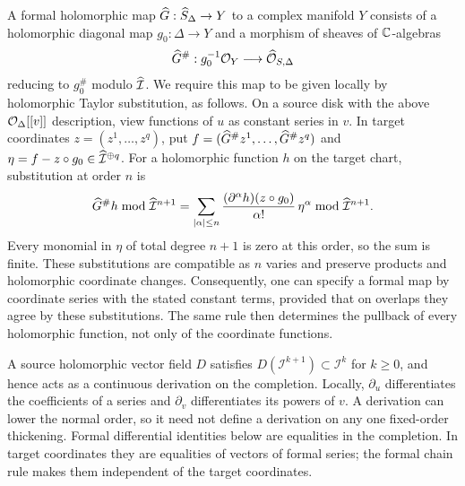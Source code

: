 A formal holomorphic map \(\widehat G:\widehat S_\Delta\to Y\) to a complex
manifold \(Y\) consists of a holomorphic diagonal map
\(g_0:\Delta\to Y\) and a morphism of sheaves of \(\mathbb C\)-algebras
\[
\widehat G^\#:g_0^{-1}\mathcal O_Y\longrightarrow\widehat{\mathcal O}_{S,\Delta}
\]
reducing to \(g_0^\#\) modulo \(\widehat{\mathcal I}\). We require this
map to be given locally by holomorphic Taylor substitution, as follows.
On a source disk with the above \(\mathcal O_\Delta[[v]]\) description,
view functions of \(u\) as constant series in \(v\).
In target coordinates \(z=(z^1,\ldots,z^q)\), put
\(f=(\widehat G^\#z^1,\ldots,\widehat G^\#z^q)\) and
\(\eta=f-z\circ g_0\in\widehat{\mathcal I}^{\oplus q}\). For a
holomorphic function \(h\) on the target chart, substitution at order
\(n\) is
\[
\widehat G^\#h\bmod\widehat{\mathcal I}^{n+1}
 =\sum_{|\alpha|\le n}
   \frac{(\partial^\alpha h)(z\circ g_0)}{\alpha!}\,
   \eta^\alpha\bmod\widehat{\mathcal I}^{n+1}.
\]
Every monomial in \(\eta\) of total degree \(n+1\) is zero at this
order, so the sum is finite.
These substitutions are compatible as \(n\) varies and preserve
products and holomorphic coordinate changes. Consequently, one can
specify a formal map by coordinate series with the stated constant
terms, provided that on overlaps they agree by these substitutions.
The same rule then determines the pullback of every holomorphic
function, not only of the coordinate functions.

A source holomorphic vector field \(D\) satisfies
\(D(\mathcal I^{k+1})\subset\mathcal I^k\) for \(k\ge0\), and
hence acts as a continuous derivation on the completion. Locally,
\(\partial_u\) differentiates the coefficients of a series and
\(\partial_v\) differentiates its powers of \(v\). A derivation
can lower the normal order, so it need not define a derivation on any one fixed-order
thickening. Formal differential identities below are equalities in
the completion. In target coordinates they are equalities of vectors
of formal series; the formal chain rule makes them independent of the
target coordinates.


